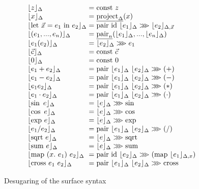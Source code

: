 \documentclass[preprint]{sigplanconf}
\newcommand{\comp}{\mathrel{>\kern-0.45em>\kern-0.45em>}}
\newcommand{\elab}[1]{\lfloor #1 \rfloor}
\theoremstyle{examplestyle}
\begin{document}
\begin{figure}
  \centering
  \begin{displaymath}
    \begin{array}{l@{\hspace{0.3em}}c@{\hspace{0.3em}}l}
      \elab{z}_\Delta & = & \mathrm{const}~z \\
      \elab{x}_\Delta & = & \underline{\mathrm{project}_\Delta}(x) \\
      \elab{\mathrm{let}~\vec{x} = e_1\textrm{ in }e_2}_\Delta & = & \mathrm{pair}~\mathrm{id}~\elab{e_1}_\Delta \comp \elab{e_2}_{\Delta, \vec{x}} \\
      \elab{(e_1,...,e_n)}_\Delta &=& \underline{\mathrm{pair}_n}(\elab{e_1}_\Delta, ..., \elab{e_n}_\Delta) \\
      \elab{e_1(e_2)}_\Delta &=& \elab{e_2}_\Delta \comp e_1 \\
      \elab{\vec{c}}_\Delta &=& \mathrm{const}~\vec{c} \\
      \elab{0}_\Delta &=& \mathrm{const}~0 \\
      \elab{e_1 + e_2}_\Delta &=& \mathrm{pair}~\elab{e_1}_\Delta~\elab{e_2}_\Delta \comp (+) \\
      \elab{e_1 - e_2}_\Delta &=& \mathrm{pair}~\elab{e_1}_\Delta~\elab{e_2}_\Delta \comp (-) \\
      \elab{e_1 e_2}_\Delta &=& \mathrm{pair}~\elab{e_1}_\Delta~\elab{e_2}_\Delta \comp (*) \\
      \elab{e_1 \cdot e_2}_\Delta &=& \mathrm{pair}~\elab{e_1}_\Delta~\elab{e_2}_\Delta \comp (\cdot) \\
      \elab{\sin~e}_\Delta &=& \elab{e}_\Delta \comp \sin \\
      \elab{\cos~e}_\Delta &=& \elab{e}_\Delta \comp \cos \\
      \elab{\mathrm{exp}~e}_\Delta &=& \elab{e}_\Delta \comp \mathrm{exp} \\
      \elab{e_1 / e_2}_\Delta &=& \mathrm{pair}~\elab{e_1}_\Delta~\elab{e_2}_\Delta \comp (/) \\
      \elab{\mathrm{sqrt}~e}_\Delta &=& \elab{e}_\Delta \comp \mathrm{sqrt} \\
      \elab{\mathrm{sum}~e}_\Delta &=& \elab{e}_\Delta \comp \mathrm{sum} \\
      \elab{\mathrm{map}~(x.~e_1)~e_2}_\Delta &=& \mathrm{pair}~\mathrm{id}~\elab{e_2}_\Delta \comp (\mathrm{map}~\elab{e_1}_{\Delta,x}) \\
      \elab{\mathrm{cross}~e_1~e_2}_\Delta &=& \mathrm{pair}~\elab{e_1}_\Delta~\elab{e_2}_\Delta \comp \mathrm{cross}
    \end{array}
  \end{displaymath}
  \caption{Desugaring of the surface syntax}
  \label{fig:desugar}
\end{figure}
\end{document}

